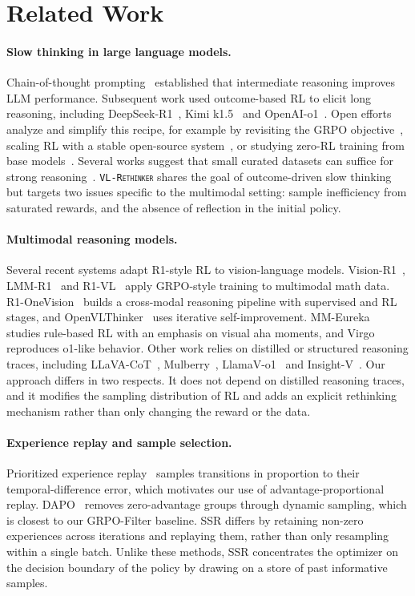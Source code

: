 \documentclass{article}
\newcommand{\model}{\texttt{\textsc{VL-Rethinker}}\xspace}
\begin{document}
\section{Related Work}

\paragraph{Slow thinking in large language models.} Chain-of-thought prompting~\cite{wei2022chain} established that intermediate reasoning improves LLM performance. Subsequent work used outcome-based RL to elicit long reasoning, including DeepSeek-R1~\cite{deepseek-r1}, Kimi k1.5~\cite{kimi-1_5} and OpenAI-o1~\cite{openai-o1}. Open efforts analyze and simplify this recipe, for example by revisiting the GRPO objective~\cite{drgrpo}, scaling RL with a stable open-source system~\cite{dapo}, or studying zero-RL training from base models~\cite{simplerl,open-reasoner-zero}. Several works suggest that small curated datasets can suffice for strong reasoning~\cite{s1,lightr1,deepscaler2025}. \model shares the goal of outcome-driven slow thinking but targets two issues specific to the multimodal setting: sample inefficiency from saturated rewards, and the absence of reflection in the initial policy.

\paragraph{Multimodal reasoning models.} Several recent systems adapt R1-style RL to vision-language models. Vision-R1~\cite{vision-r1}, LMM-R1~\cite{lmm-r1} and R1-VL~\cite{r1vl} apply GRPO-style training to multimodal math data. R1-OneVision~\cite{R1OneVision} builds a cross-modal reasoning pipeline with supervised and RL stages, and OpenVLThinker~\cite{OpenVLThinker} uses iterative self-improvement. MM-Eureka~\cite{mmeureka} studies rule-based RL with an emphasis on visual aha moments, and Virgo~\cite{virgo} reproduces o1-like behavior. Other work relies on distilled or structured reasoning traces, including LLaVA-CoT~\cite{llavacot}, Mulberry~\cite{Mulberry}, LlamaV-o1~\cite{llamav_o1} and Insight-V~\cite{insight_v}. Our approach differs in two respects. It does not depend on distilled reasoning traces, and it modifies the sampling distribution of RL and adds an explicit rethinking mechanism rather than only changing the reward or the data.

\paragraph{Experience replay and sample selection.} Prioritized experience replay~\cite{per} samples transitions in proportion to their temporal-difference error, which motivates our use of advantage-proportional replay. DAPO~\cite{dapo} removes zero-advantage groups through dynamic sampling, which is closest to our GRPO-Filter baseline. SSR differs by retaining non-zero experiences across iterations and replaying them, rather than only resampling within a single batch. Unlike these methods, SSR concentrates the optimizer on the decision boundary of the policy by drawing on a store of past informative samples.
\end{document}
